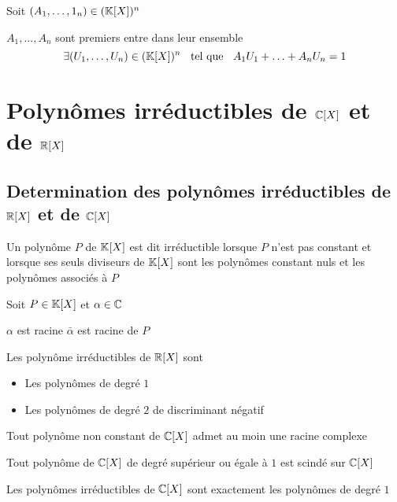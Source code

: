 \begin{thm}[Bézout]
Soit $(A_1, \ldots, 1_n) \in (\mathbb{K}[X])^n$

$A_1, \ldots, A_n$ sont premiers entre dans leur ensemble \ssi
\[
    \exists (U_1, \ldots, U_n) \in (\mathbb{K}[X])^n \;\;\text{ tel que }\;\;
    A_1 U_1 + \ldots + A_n U_n = 1
\]
\end{thm}

\section{Polynômes irréductibles de $\mathbb{C}[X]$ et de $\mathbb{R}[X]$}

\subsection{Determination des polynômes irréductibles de $\mathbb{R}[X]$ et de
$\mathbb{C}[X]$}

\begin{dfn}
Un polynôme $P$ de $\mathbb{K}[X]$ est dit irréductible lorsque $P$ n'est pas
constant et lorsque ses seuls diviseurs de $\mathbb{K}[X]$ sont les polynômes
constant nuls et les polynômes associés à $P$
\end{dfn}

\begin{prp}
Soit $P \in \mathbb{K}[X]$ et $\alpha \in \mathbb{C}$

$\alpha$ est racine \ssi $\bar{\alpha}$ est racine de $P$
\end{prp}

\begin{thm}
Les polynôme irréductibles de $\mathbb{R}[X]$ sont
\begin{itemize}
    \item Les polynômes de degré $1$
    \item Les polynômes de degré $2$ de discriminant négatif
\end{itemize}
\end{thm}

\begin{thm}
Tout polynôme non constant de $\mathbb{C}[X]$ admet au moin une racine complexe
\end{thm}

\begin{prp}
Tout polynôme de $\mathbb{C}[X]$ de degré supérieur ou égale à $1$ est scindé
sur $\mathbb{C}[X]$
\end{prp}

\begin{prp}
Les polynômes irréductibles de $\mathbb{C}[X]$ sont exactement les polynômes
de degré $1$
\end{prp}




